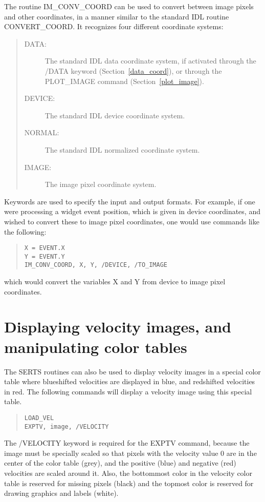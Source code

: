 The routine IM\_CONV\_COORD can be used to convert between image pixels and
other coordinates, in a manner similar to the standard IDL routine
CONVERT\_COORD.  It recognizes four different coordinate systems:
\begin{quote}
\begin{description}
\item[DATA:]
The standard IDL data coordinate system, if activated through the /DATA
keyword (Section~\ref{data_coord}), or through the PLOT\_IMAGE command
(Section~\ref{plot_image}).
\item[DEVICE:]
The standard IDL device coordinate system.
\item[NORMAL:]
The standard IDL normalized coordinate system.
\item[IMAGE:]
The image pixel coordinate system.
\end{description}
\end{quote}
Keywords are used to specify the input and output formats.  For example, if one
were processing a widget event position, which is given in device coordinates,
and wished to convert these to image pixel coordinates, one would use commands
like the following:
\begin{quote}
\begin{verbatim}
X = EVENT.X
Y = EVENT.Y
IM_CONV_COORD, X, Y, /DEVICE, /TO_IMAGE
\end{verbatim}
\end{quote}
which would convert the variables X and Y from device to image pixel
coordinates.

\section{Displaying velocity images, and manipulating color tables}

The SERTS routines can also be used to display velocity images in a special
color table where blueshifted velocities are displayed in blue, and redshifted
velocities in red.  The following commands will display a velocity image using
this special table.
\begin{quote}
\begin{verbatim}
LOAD_VEL
EXPTV, image, /VELOCITY
\end{verbatim}
\end{quote}
The /VELOCITY keyword is required for the EXPTV command, because the image must
be specially scaled so that pixels with the velocity value 0 are in the center
of the color table (grey), and the positive (blue) and negative (red)
velocities are scaled around it.  Also, the bottommost color in the velocity
color table is reserved for missing pixels (black) and the topmost color is
reserved for drawing graphics and labels (white).

